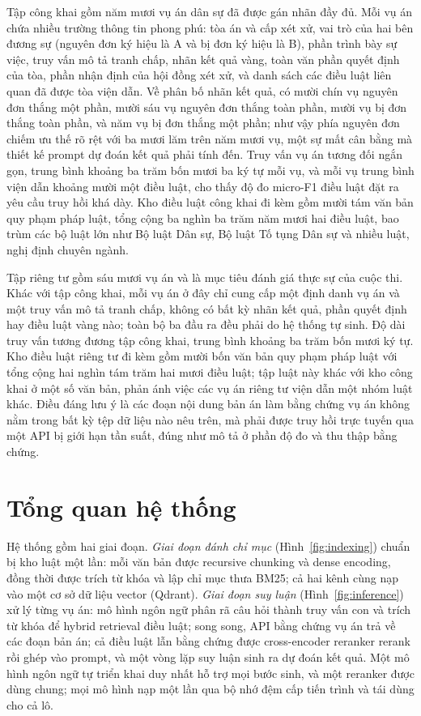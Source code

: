 \documentclass[conference]{IEEEtran}
\begin{document}
Tập công khai gồm năm mươi vụ án dân sự đã được gán nhãn đầy đủ. Mỗi vụ án chứa
nhiều trường thông tin phong phú: tòa án và cấp xét xử, vai trò của hai bên
đương sự (nguyên đơn ký hiệu là A và bị đơn ký hiệu là B), phần trình bày sự việc,
truy vấn mô tả tranh chấp, nhãn kết quả vàng, toàn văn phần quyết định của tòa,
phần nhận định của hội đồng xét xử, và danh sách các điều luật liên quan đã được
tòa viện dẫn. Về phân bố nhãn kết quả, có mười chín vụ nguyên đơn thắng một phần,
mười sáu vụ nguyên đơn thắng toàn phần, mười vụ bị đơn thắng toàn phần, và năm vụ
bị đơn thắng một phần; như vậy phía nguyên đơn chiếm ưu thế rõ rệt với ba mươi
lăm trên năm mươi vụ, một sự mất cân bằng mà thiết kế prompt dự đoán kết quả phải
tính đến. Truy vấn vụ án tương đối ngắn gọn, trung bình khoảng ba trăm bốn mươi
ba ký tự mỗi vụ, và mỗi vụ trung bình viện dẫn khoảng mười một điều luật, cho
thấy độ đo micro-F1 điều luật đặt ra yêu cầu truy hồi khá dày. Kho điều luật công
khai đi kèm gồm mười tám văn bản quy phạm pháp luật, tổng cộng ba nghìn ba trăm
năm mươi hai điều luật, bao trùm các bộ luật lớn như Bộ luật Dân sự, Bộ luật Tố
tụng Dân sự và nhiều luật, nghị định chuyên ngành.

Tập riêng tư gồm sáu mươi vụ án và là mục tiêu đánh giá thực sự của cuộc thi.
Khác với tập công khai, mỗi vụ án ở đây chỉ cung cấp một định danh vụ án và một
truy vấn mô tả tranh chấp, không có bất kỳ nhãn kết quả, phần quyết định hay điều
luật vàng nào; toàn bộ ba đầu ra đều phải do hệ thống tự sinh. Độ dài truy vấn
tương đương tập công khai, trung bình khoảng ba trăm bốn mươi ký tự. Kho điều
luật riêng tư đi kèm gồm mười bốn văn bản quy phạm pháp luật với tổng cộng hai
nghìn tám trăm hai mươi điều luật; tập luật này khác với kho công khai ở một số
văn bản, phản ánh việc các vụ án riêng tư viện dẫn một nhóm luật khác. Điều đáng
lưu ý là các đoạn nội dung bản án làm bằng chứng vụ án không nằm trong bất kỳ tệp
dữ liệu nào nêu trên, mà phải được truy hồi trực tuyến qua một API bị giới hạn
tần suất, đúng như mô tả ở phần độ đo và thu thập bằng chứng.

\section{Tổng quan hệ thống}
Hệ thống gồm hai giai đoạn. \emph{Giai đoạn đánh chỉ mục} (Hình~\ref{fig:indexing}) chuẩn bị kho luật một lần: mỗi văn bản được recursive chunking và dense encoding, đồng thời được trích từ khóa và lập chỉ mục thưa BM25; cả hai kênh cùng nạp vào một cơ sở dữ liệu vector (Qdrant). \emph{Giai đoạn suy luận} (Hình~\ref{fig:inference}) xử lý từng vụ án: mô hình ngôn ngữ phân rã câu hỏi thành truy vấn con và trích từ khóa để hybrid retrieval điều luật; song song, API bằng chứng vụ án trả về các đoạn bản án; cả điều luật lẫn bằng chứng được cross-encoder reranker rerank rồi ghép vào prompt, và một vòng lặp suy luận sinh ra dự đoán kết quả. Một mô hình ngôn ngữ tự triển khai duy nhất hỗ trợ mọi bước sinh, và một reranker được dùng chung; mọi mô hình nạp một lần qua bộ nhớ đệm cấp tiến trình và tái dùng cho cả lô.
\end{document}
